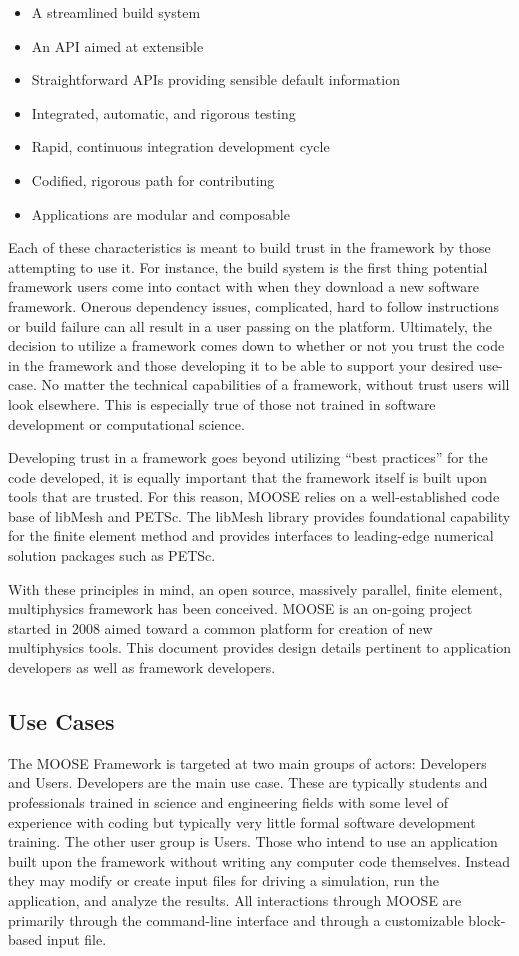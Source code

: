 \documentclass{INLreport}
\begin{document}
\begin{itemize}
  \item A streamlined build system
  \item An API aimed at extensible
  \item Straightforward APIs providing sensible default information
  \item Integrated, automatic, and rigorous testing
  \item Rapid, continuous integration development cycle
  \item Codified, rigorous path for contributing
  \item Applications are modular and composable
\end{itemize}

Each of these characteristics is meant to build trust in the framework by those attempting to use it. For instance,
the build system is the first thing potential framework users come into contact with when they download a new
software framework. Onerous dependency issues, complicated, hard to follow instructions or build failure can all
result in a user passing on the platform. Ultimately, the decision to utilize a framework comes down to whether or
not you trust the code in the framework and those developing it to be able to support your desired use-case.
No matter the technical capabilities of a framework, without trust users will look elsewhere. This is especially
true of those not trained in software development or computational science.

Developing trust in a framework goes beyond utilizing ``best practices'' for the code developed, it is equally
important that the framework itself is built upon tools that are trusted. For this reason, MOOSE relies on a
well-established code base of libMesh and PETSc.
The libMesh library provides foundational capability for the finite element method and provides interfaces to
leading-edge numerical solution packages such as PETSc.

With these principles in mind, an open source, massively parallel, finite element, multiphysics framework has been conceived.
MOOSE is an on-going project started in 2008 aimed toward a common platform for creation of new multiphysics tools.
This document provides design details pertinent to application developers as well as framework developers.

\subsection{Use Cases}
The MOOSE Framework is targeted at two main groups of actors: Developers and Users. Developers are the main
use case. These are typically students and professionals trained in science and engineering fields with some
level of experience with coding but typically very little formal software development training. The other user
group is Users. Those who intend to use an application built upon the framework without writing any computer
code themselves. Instead they may modify or create input files for driving a simulation, run the application, and
analyze the results. All interactions through MOOSE are primarily through the command-line interface and through
a customizable block-based input file.
\end{document}
